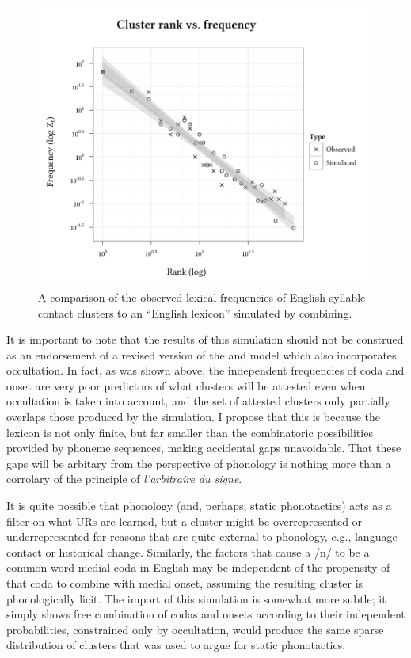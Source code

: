 \begin{figure}
\centering
\includegraphics{sim.pdf}
\caption{A comparison of the observed lexical frequencies of English syllable contact clusters to an ``English lexicon'' simulated by combining.}
\label{sim}
\end{figure}

It is important to note that the results of this simulation should not be construed as an endorsement of a revised version of the \citet{Pierrehumbert1994} and \citet{Coleman1997} model which also incorporates occultation. In fact, as was shown above, the independent frequencies of coda and onset are very poor predictors of what clusters will be attested even when occultation is taken into account, and the set of attested clusters only partially overlaps those produced by the simulation. I propose that this is because the lexicon is not only finite, but far smaller than the combinatoric possibilities provided by phoneme sequences, making accidental gaps unavoidable. That these gaps will be arbitary from the perspective of phonology is nothing more than a corrolary of the principle of \emph{l'arbitraire du signe}. 

It is quite possible that phonology (and, perhaps, static phonotactics) acts as a filter on what URs are learned, but a cluster might be overrepresented or underrepresented for reasons that are quite external to phonology, e.g., language contact or historical change. Similarly, the factors that cause a /n/ to be a common word-medial coda in English may be independent of the propensity of that coda to combine with medial onset, assuming the resulting cluster is phonologically licit. The import of this simulation is somewhat more subtle; it simply shows free combination of codas and onsets according to their independent probabilities, constrained only by occultation, would produce the same sparse distribution of clusters that was used to argue for static phonotactics.

